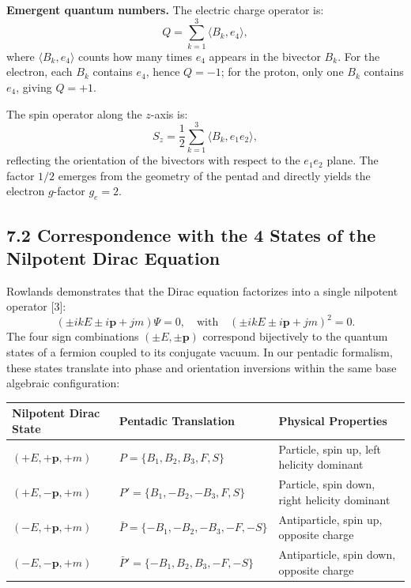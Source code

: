 \documentclass[11pt]{article}
\begin{document}
\textbf{Emergent quantum numbers.} The electric charge operator is: \[
Q = \sum_{k=1}^3 \langle B_k, e_4 \rangle,
\] where \(\langle B_k, e_4 \rangle\) counts how many times \(e_4\)
appears in the bivector \(B_k\). For the electron, each \(B_k\) contains
\(e_4\), hence \(Q=-1\); for the proton, only one \(B_k\) contains
\(e_4\), giving \(Q=+1\).

The spin operator along the \(z\)-axis is: \[
S_z = \frac12 \sum_{k=1}^3 \langle B_k, e_1e_2 \rangle,
\] reflecting the orientation of the bivectors with respect to the
\(e_1e_2\) plane. The factor \(1/2\) emerges from the geometry of the
pentad and directly yields the electron \(g\)-factor \(g_e = 2\).

\hypertarget{correspondence-with-the-4-states-of-the-nilpotent-dirac-equation}{%
\subsection{7.2 Correspondence with the 4 States of the Nilpotent Dirac
Equation}\label{correspondence-with-the-4-states-of-the-nilpotent-dirac-equation}}

Rowlands demonstrates that the Dirac equation factorizes into a single
nilpotent operator {[}3{]}: \[
(\pm i k E \pm i \mathbf{p} + j m) \Psi = 0, \quad \text{with} \quad (\pm i k E \pm i \mathbf{p} + j m)^2 = 0.
\] The four sign combinations \((\pm E, \pm \mathbf{p})\) correspond
bijectively to the quantum states of a fermion coupled to its conjugate
vacuum. In our pentadic formalism, these states translate into phase and
orientation inversions within the same base algebraic configuration:

\begin{table}[H]
\centering
\begin{tabular}{@{}lll@{}}
\toprule
Nilpotent Dirac State & Pentadic Translation & Physical Properties \\
\midrule
$(+E, +\mathbf{p}, +m)$ & $P = \{B_1, B_2, B_3, F, S\}$ & Particle, spin up, left helicity dominant \\
$(+E, -\mathbf{p}, +m)$ & $P' = \{B_1, -B_2, -B_3, F, S\}$ & Particle, spin down, right helicity dominant \\
$(-E, +\mathbf{p}, +m)$ & $\bar{P} = \{-B_1, -B_2, -B_3, -F, -S\}$ & Antiparticle, spin up, opposite charge \\
$(-E, -\mathbf{p}, +m)$ & $\bar{P}' = \{-B_1, B_2, B_3, -F, -S\}$ & Antiparticle, spin down, opposite charge \\
\bottomrule
\end{tabular}
\end{table}
\end{document}

